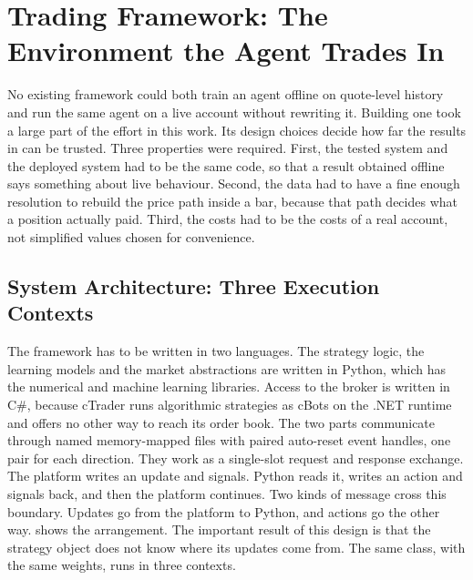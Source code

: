 \section{Trading Framework: The Environment the Agent Trades In}
\label{Section:TradingFramework}

No existing framework could both train an agent offline on quote-level history and run the same agent on a live account without rewriting it. Building one took a large part of the effort in this work. Its design choices decide how far the results in  can be trusted. Three properties were required. First, the tested system and the deployed system had to be the same code, so that a result obtained offline says something about live behaviour. Second, the data had to have a fine enough resolution to rebuild the price path inside a bar, because that path decides what a position actually paid. Third, the costs had to be the costs of a real account, not simplified values chosen for convenience.

\subsection{System Architecture: Three Execution Contexts}

The framework has to be written in two languages. The strategy logic, the learning models and the market abstractions are written in Python, which has the numerical and machine learning libraries. Access to the broker is written in C\#, because cTrader \cite{noauthor_forex_nodate} runs algorithmic strategies as cBots on the .NET runtime and offers no other way to reach its order book. The two parts communicate through named memory-mapped files with paired auto-reset event handles, one pair for each direction. They work as a single-slot request and response exchange. The platform writes an update and signals. Python reads it, writes an action and signals back, and then the platform continues. Two kinds of message cross this boundary. Updates go from the platform to Python, and actions go the other way.  shows the arrangement. The important result of this design is that the strategy object does not know where its updates come from. The same class, with the same weights, runs in three contexts.

